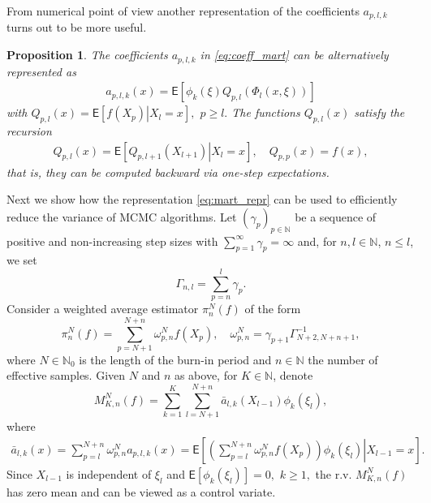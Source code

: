 \documentclass[aap,preprint]{imsart}
\newtheorem{prop}[thm]{Proposition}
\begin{document}
From  numerical point of view another representation of the coefficients \(a_{p,l,k}\)  turns out to be more useful.
\begin{prop}
The coefficients \(a_{p,l,k}\) in \eqref{eq:coeff_mart}  can be alternatively represented as
\begin{eqnarray*}
a_{p,l,k}(x)=\mathsf{E}\left[\phi_k\left(\xi\right)Q_{p,l}\left(\Phi_l(x,\xi)\right)\right]
\end{eqnarray*}
with \(Q_{p,l}(x)=\mathsf{E}\left[\left.f(X_{p})\right|X_{l}=x\right],\) \(p\geq l.\)
The functions \(Q_{p,l}(x)\)   satisfy the recursion
\begin{eqnarray}
\label{eq:qpl}
Q_{p,l}(x)=\mathsf{E}\left[\left.Q_{p,l+1}(X_{l+1})\right|X_{l}=x\right],\quad Q_{p,p}(x)=f(x),
\end{eqnarray}
that is, they can be computed backward via  one-step expectations.
\end{prop}
Next we show how  the representation \eqref{eq:mart_repr} can be used to efficiently reduce the variance of MCMC algorithms.  Let $(\gamma_{p})_{p\in\mathbb N}$ be a sequence of positive and non-increasing
step sizes
with $\sum_{p=1}^\infty \gamma_p=\infty$
and, for $n,l\in\mathbb{N}$, $n\le l$, we set
\[
\Gamma_{n,l}=\sum_{p=n}^{l}\gamma_{p}.
\]
 Consider a weighted average estimator $\pi_{n}^{N}(f)$ of the form
\begin{equation}\label{eq:29032018a2}
\pi_{n}^{N}(f)=\sum_{p=N+1}^{N+n}\omega_{p,n}^{N}f(X_{p}),\quad\omega_{p,n}^{N}=\gamma_{p+1}\Gamma_{N+2,N+n+1}^{-1},
\end{equation}
where $N\in\mathbb N_0$ is the length of the burn-in period and $n\in\mathbb N$
the number of effective samples.
Given $N$ and $n$ as above, for $K\in\mathbb N$, denote
\begin{equation}
M_{K,n}^N(f) =\sum_{k=1}^{K}\sum_{l=N+1}^{N+n}\bar a_{l,k}(X_{l-1})\phi_k(\xi_{l}),
\label{eq:29032018a5}
\end{equation}
where
\begin{align}
\label{eq:first-expression-bar-a-l-k}
\bar{a}_{l,k}(x)
=\sum_{p=l}^{N+n}\omega_{p,n}^{N}a_{p,l,k}(x)=\mathsf{E}\left[\left.\left(\sum_{p=l}^{N+n}\omega_{p,n}^{N}f(X_{p})\right)\phi_k(\xi_{l})\right|X_{l-1}=x\right].
\end{align}
Since \(X_{l-1}\) is independent of \(\xi_{l}\) and \(\mathsf{E}[\phi_k(\xi_{l})]=0,\) \(k\geq 1,\)  the r.v.  \(M_{K,n}^N(f)\) has zero mean and can be viewed as a control variate. 
\end{document}
